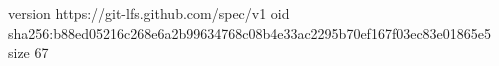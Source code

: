 version https://git-lfs.github.com/spec/v1
oid sha256:b88ed05216c268e6a2b99634768c08b4e33ac2295b70ef167f03ec83e01865e5
size 67
